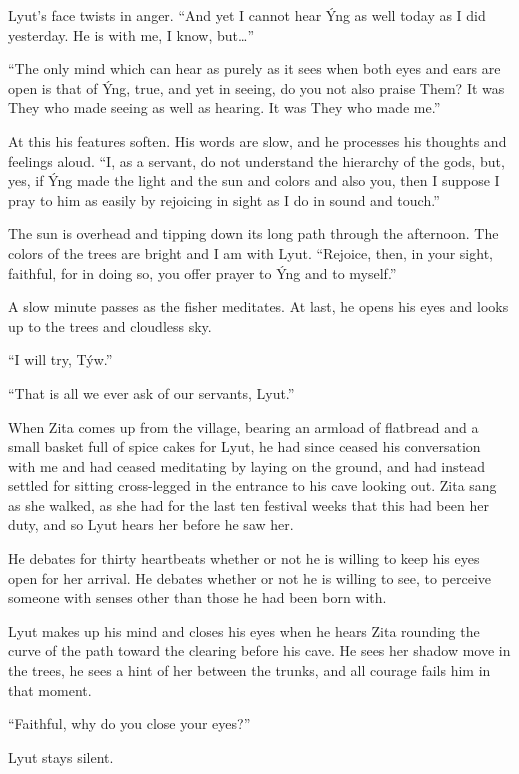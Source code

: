 Lyut's face twists in anger. ``And yet I cannot hear Ýng as well today as I did yesterday. He is with me, I know, but\ldots''

``The only mind which can hear as purely as it sees when both eyes and ears are open is that of Ýng, true, and yet in seeing, do you not also praise Them? It was They who made seeing as well as hearing. It was They who made me.''

At this his features soften. His words are slow, and he processes his thoughts and feelings aloud. ``I, as a servant, do not understand the hierarchy of the gods, but, yes, if Ýng made the light and the sun and colors and also you, then I suppose I pray to him as easily by rejoicing in sight as I do in sound and touch.''

The sun is overhead and tipping down its long path through the afternoon. The colors of the trees are bright and I am with Lyut. ``Rejoice, then, in your sight, faithful, for in doing so, you offer prayer to Ýng and to myself.''

A slow minute passes as the fisher meditates. At last, he opens his eyes and looks up to the trees and cloudless sky.

``I will try, Týw.''

``That is all we ever ask of our servants, Lyut.''

\secdiv

\noindent When Zita comes up from the village, bearing an armload of flatbread and a small basket full of spice cakes for Lyut, he had since ceased his conversation with me and had ceased meditating by laying on the ground, and had instead settled for sitting cross-legged in the entrance to his cave looking out. Zita sang as she walked, as she had for the last ten festival weeks that this had been her duty, and so Lyut hears her before he saw her.

He debates for thirty heartbeats whether or not he is willing to keep his eyes open for her arrival. He debates whether or not he is willing to see, to perceive someone with senses other than those he had been born with.

Lyut makes up his mind and closes his eyes when he hears Zita rounding the curve of the path toward the clearing before his cave. He sees her shadow move in the trees, he sees a hint of her between the trunks, and all courage fails him in that moment.

``Faithful, why do you close your eyes?''

Lyut stays silent.

